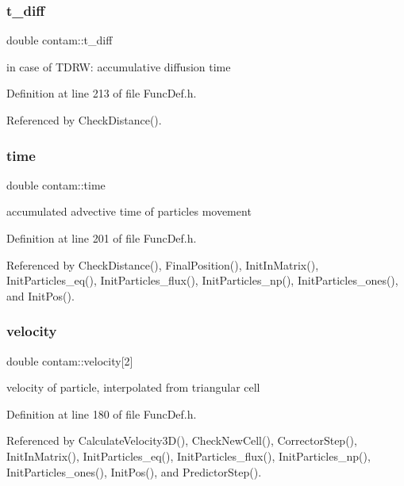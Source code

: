 \mbox{\label{structcontam_aaff43bc31b910d7ac48f5d0a78f2212b}} 
\subsubsection{\texorpdfstring{t\_diff}{t\_diff}}
{\footnotesize\ttfamily double contam\+::t\+\_\+diff}

in case of T\+D\+RW\+: accumulative diffusion time 

Definition at line 213 of file Func\+Def.\+h.



Referenced by Check\+Distance().

\mbox{\label{structcontam_a11c5e87e6e62d258648d5a02472251d5}} 
\subsubsection{\texorpdfstring{time}{time}}
{\footnotesize\ttfamily double contam\+::time}

accumulated advective time of particles movement 

Definition at line 201 of file Func\+Def.\+h.



Referenced by Check\+Distance(), Final\+Position(), Init\+In\+Matrix(), Init\+Particles\+\_\+eq(), Init\+Particles\+\_\+flux(), Init\+Particles\+\_\+np(), Init\+Particles\+\_\+ones(), and Init\+Pos().

\mbox{\label{structcontam_a70e44829116675e21bda7422f0c2b777}} 
\subsubsection{\texorpdfstring{velocity}{velocity}}
{\footnotesize\ttfamily double contam\+::velocity\mbox{[}2\mbox{]}}

velocity of particle, interpolated from triangular cell 

Definition at line 180 of file Func\+Def.\+h.



Referenced by Calculate\+Velocity3\+D(), Check\+New\+Cell(), Corrector\+Step(), Init\+In\+Matrix(), Init\+Particles\+\_\+eq(), Init\+Particles\+\_\+flux(), Init\+Particles\+\_\+np(), Init\+Particles\+\_\+ones(), Init\+Pos(), and Predictor\+Step().

